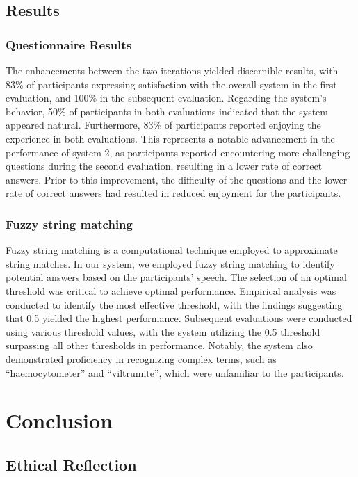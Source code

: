 \documentclass[hidelinks, 11pt]{article}
\begin{document}
\subsection{Results}
\label{subsec:results}

\subsubsection{Questionnaire Results}
The enhancements between the two iterations yielded discernible results, with 83\% of participants expressing satisfaction with the overall system in the first evaluation, and 100\% in the subsequent evaluation. Regarding the system's behavior, 50\% of participants in both evaluations indicated that the system appeared natural. Furthermore, 83\% of participants reported enjoying the experience in both evaluations. This represents a notable advancement in the performance of system 2, as participants reported encountering more challenging questions during the second evaluation, resulting in a lower rate of correct answers. Prior to this improvement, the difficulty of the questions and the lower rate of correct answers had resulted in reduced enjoyment for the participants.

\subsubsection{Fuzzy string matching}
\label{subsec:fuzzy_string}
Fuzzy string matching is a computational technique employed to approximate string matches. In our system, we employed fuzzy string matching to identify potential answers based on the participants' speech. The selection of an optimal threshold was critical to achieve optimal performance. Empirical analysis was conducted to identify the most effective threshold, with the findings suggesting that 0.5 yielded the highest performance. Subsequent evaluations were conducted using various threshold values, with the system utilizing the 0.5 threshold surpassing all other thresholds in performance. Notably, the system also demonstrated proficiency in recognizing complex terms, such as ``haemocytometer'' and ``viltrumite'', which were unfamiliar to the participants.

\section{Conclusion}
\label{sec:conclusion}

\subsection{Ethical Reflection}
\label{subsec:ethics}
\end{document}
